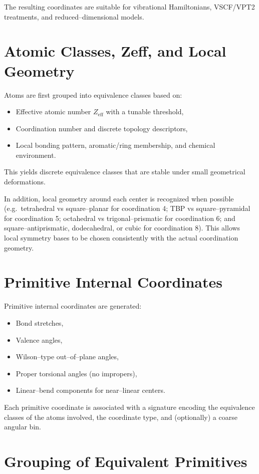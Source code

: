 \documentclass[11pt,a4paper]{article}
\begin{document}
The resulting coordinates are suitable for vibrational Hamiltonians,
VSCF/VPT2 treatments, and reduced--dimensional models.

\section{Atomic Classes, Zeff, and Local Geometry}

Atoms are first grouped into equivalence classes based on:
\begin{itemize}
  \item Effective atomic number $Z_{\mathrm{eff}}$ with a tunable threshold,
  \item Coordination number and discrete topology descriptors,
  \item Local bonding pattern, aromatic/ring membership, and chemical environment.
\end{itemize}

This yields discrete equivalence classes that are stable under small
geometrical deformations.

In addition, local geometry around each center is recognized when possible
(e.g.\ tetrahedral vs square--planar for coordination 4; TBP vs square--pyramidal
for coordination 5; octahedral vs trigonal--prismatic for coordination 6; and
square--antiprismatic, dodecahedral, or cubic for coordination 8).
This allows local symmetry bases to be chosen consistently with the actual
coordination geometry.

\section{Primitive Internal Coordinates}

Primitive internal coordinates are generated:
\begin{itemize}
  \item Bond stretches,
  \item Valence angles,
  \item Wilson--type out--of--plane angles,
  \item Proper torsional angles (no impropers),
  \item Linear--bend components for near--linear centers.
\end{itemize}

Each primitive coordinate is associated with a signature encoding the
equivalence classes of the atoms involved, the coordinate type,
and (optionally) a coarse angular bin.

\section{Grouping of Equivalent Primitives}
\end{document}
